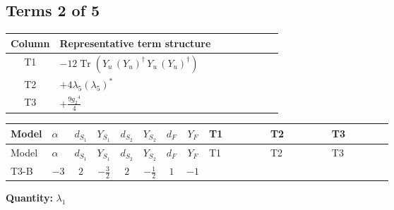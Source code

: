 \documentclass[8pt]{article}
\begin{document}
\begin{landscape}
\subsection*{Terms 2 of 5}
\begin{center}
\begin{tabular}{@{}c >{\raggedright\arraybackslash}p{0.82\linewidth}@{}}
\toprule
Column & Representative term structure \\
\midrule
T1 & \(\displaystyle -12 \operatorname{Tr}\!\left({Y_u}\,\left({Y_u}\right)^{\dagger}\,{Y_u}\,\left({Y_u}\right)^{\dagger}\right)\) \\
\midrule
T2 & \(\displaystyle +4 {\lambda_5} \left({\lambda_5}\right)^{*}\) \\
\midrule
T3 & \(\displaystyle +\frac{9 {g_2}^4}{4}\) \\
\midrule
\bottomrule
\end{tabular}
\end{center}
\smallskip
\tiny
\begin{longtable}{@{}llcccccc >{\raggedright\arraybackslash}p{0.21\linewidth} >{\raggedright\arraybackslash}p{0.21\linewidth} >{\raggedright\arraybackslash}p{0.21\linewidth}@{}}
\toprule
Model & $\alpha$ & $d_{S_1}$ & $Y_{S_1}$ & $d_{S_2}$ & $Y_{S_2}$ & $d_F$ & $Y_F$ & T1 & T2 & T3 \\
\midrule
\endfirsthead
\toprule
Model & $\alpha$ & $d_{S_1}$ & $Y_{S_1}$ & $d_{S_2}$ & $Y_{S_2}$ & $d_F$ & $Y_F$ & T1 & T2 & T3 \\
\midrule
\endhead
T3-B & $-3$ & $2$ & $-\frac{3}{2}$ & $2$ & $-\frac{1}{2}$ & $1$ & $-1$ & \scriptsize\adjustbox{max width=\linewidth}{$\begin{gathered} -12 \operatorname{Tr}\!\left({Y_u}\,\left({Y_u}\right)^{\dagger}\,{Y_u}\,\left({Y_u}\right)^{\dagger}\right)\end{gathered}$} & \scriptsize\adjustbox{max width=\linewidth}{$\begin{gathered} +4 {\lambda_5} \left({\lambda_5}\right)^{*}\end{gathered}$} & \scriptsize\adjustbox{max width=\linewidth}{$\begin{gathered} +\frac{9 {g_2}^4}{4}\end{gathered}$} \\
\midrule
\bottomrule
\end{longtable}
\clearpage
\noindent\textbf{Quantity: }$\lambda_1$\par\smallskip

\end{landscape}
\end{document}
